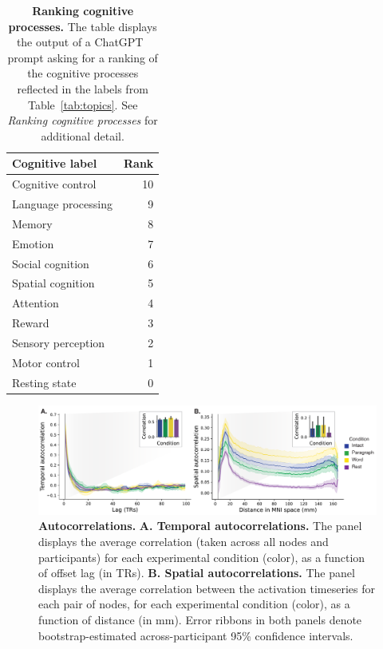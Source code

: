 \documentclass[english]{article}
\begin{document}
\newpage

\begin{table}[t]
\begin{center}
\begin{tabular}{lr}
  \toprule
  Cognitive label &  Rank \\
  \midrule
  Cognitive control   &    10 \\
  Language processing &     9 \\
  Memory              &     8 \\
  Emotion             &     7 \\
  Social cognition    &     6 \\
  Spatial cognition   &     5 \\
  Attention           &     4 \\
  Reward              &     3 \\
  Sensory perception  &     2 \\
  Motor control       &     1 \\
  Resting state       &     0 \\
  \bottomrule
\end{tabular}

\caption{\textbf{Ranking cognitive processes.} The table displays the output of
a ChatGPT~\citep{ChatGPT} prompt asking for a ranking of the cognitive
processes reflected in the labels from Table~\ref{tab:topics}. See \textit{Ranking cognitive
processes} for additional detail.}
\label{tab:topic-tags}

\end{center}
\end{table}
  
\newpage

\begin{figure}[t]
  \centering
  \includegraphics[width=\textwidth]{figs/autocorrelations}

\caption{\textbf{Autocorrelations.} \textbf{A. Temporal autocorrelations.} The
panel displays the average correlation (taken across all nodes and
participants) for each experimental condition (color), as a function of offset
lag (in TRs). \textbf{B. Spatial autocorrelations.} The panel displays the
average correlation between the activation timeseries for each pair of nodes,
for each experimental condition (color), as a function of distance (in mm).  Error ribbons in
both panels denote bootstrap-estimated across-participant 95\% confidence intervals.}
\label{fig:autocorrs}
\end{figure}
\end{document}
